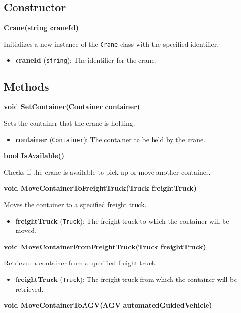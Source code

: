 \documentclass[12pt]{article}
\begin{document}
\subsection*{Constructor}

\textbf{Crane(string craneId)}

Initializes a new instance of the \texttt{Crane} class with the specified identifier.

\begin{itemize}
    \item \textbf{craneId} (\texttt{string}): The identifier for the crane.
\end{itemize}

\subsection*{Methods}

\textbf{void SetContainer(Container container)}

Sets the container that the crane is holding.

\begin{itemize}
    \item \textbf{container} (\texttt{Container}): The container to be held by the crane.
\end{itemize}

\textbf{bool IsAvailable()}

Checks if the crane is available to pick up or move another container.

\textbf{void MoveContainerToFreightTruck(Truck freightTruck)}

Moves the container to a specified freight truck.

\begin{itemize}
    \item \textbf{freightTruck} (\texttt{Truck}): The freight truck to which the container will be moved.
\end{itemize}

\textbf{void MoveContainerFromFreightTruck(Truck freightTruck)}

Retrieves a container from a specified freight truck.

\begin{itemize}
    \item \textbf{freightTruck} (\texttt{Truck}): The freight truck from which the container will be retrieved.
\end{itemize}

\textbf{void MoveContainerToAGV(AGV automatedGuidedVehicle)}
\end{document}
